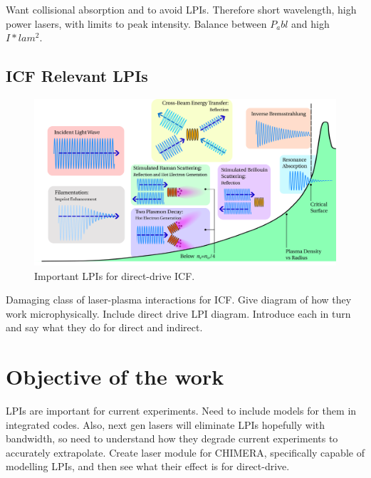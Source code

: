 Want collisional absorption and to avoid LPIs.
Therefore short wavelength, high power lasers, with limits to peak intensity.
Balance between $P_abl$ and high $I*lam^2$.

\subsection{ICF Relevant LPIs}%
\label{sec:intro_LPIs}

\begin{figure}[t!]
    \includegraphics[width=\linewidth]{Introduction/Images/LPI diagram.png}
    \centering
    \caption{Important \ac{LPIs} for direct-drive \ac{ICF}.
    }%
    \label{fig:intro_dd_lpis}
\end{figure}

Damaging class of laser-plasma interactions for ICF.
Give diagram of how they work microphysically.
Include direct drive LPI diagram.
Introduce each in turn and say what they do for direct and indirect.

\section{Objective of the work}%
\label{sec:intro_objective}

LPIs are important for current experiments.
Need to include models for them in integrated codes.
Also, next gen lasers will eliminate LPIs hopefully with bandwidth, so need to understand how they degrade current experiments to accurately extrapolate.
Create laser module for CHIMERA, specifically capable of modelling LPIs, and then see what their effect is for direct-drive.
